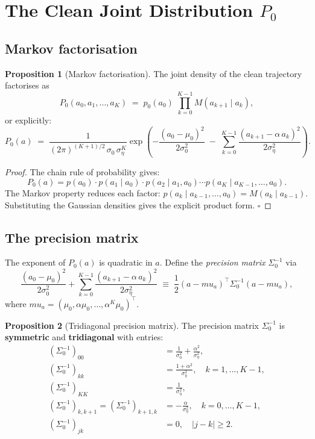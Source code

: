 \documentclass[12pt, a4paper]{article}
\def\ba{a}%
\def\bmu{mu}%
\def\bm#1{#1}%
\theoremstyle{definition}
\newtheorem{proposition}{Proposition}[section]
\newcommand{\ba}{\bm{a}}
\newcommand{\bmu}{\bm{\mu}}
\begin{document}
\section{The Clean Joint Distribution \texorpdfstring{$P_0$}{P0}}

\subsection{Markov factorisation}

\begin{proposition}[Markov factorisation]\label{prop:markov}
The joint density of the clean trajectory factorises as
\[
  P_0(a_0, a_1, \ldots, a_K)
  \;=\;
  p_0(a_0)\;\prod_{k=0}^{K-1} M(a_{k+1} \mid a_k),
\]
or explicitly:
\[
  P_0(\ba)
  \;=\;
  \frac{1}{(2\pi)^{(K+1)/2}\,\sigma_0\,\sigma_\eta^K}
  \exp\!\left(
    -\frac{(a_0-\mu_0)^2}{2\sigma_0^2}
    \;-\;
    \sum_{k=0}^{K-1}\frac{(a_{k+1}-\alpha\,a_k)^2}{2\sigma_\eta^2}
  \right).
\]
\end{proposition}

\begin{proof}
The chain rule of probability gives:
\[
  P_0(\ba) = p(a_0)\cdot p(a_1\mid a_0)\cdot p(a_2\mid a_1,a_0)
  \cdots p(a_K\mid a_{K-1},\ldots,a_0).
\]
The Markov property reduces each factor: $p(a_k\mid a_{k-1},\ldots,a_0)
= M(a_k\mid a_{k-1})$. Substituting the Gaussian densities gives the
explicit product form. \qquad$\square$
\end{proof}

\subsection{The precision matrix}

The exponent of $P_0(\ba)$ is quadratic in $\ba$. Define the
\emph{precision matrix} $\Sigma_0^{-1}$ via
\[
  \frac{(a_0-\mu_0)^2}{2\sigma_0^2}
  + \sum_{k=0}^{K-1}\frac{(a_{k+1}-\alpha\,a_k)^2}{2\sigma_\eta^2}
  \;\equiv\;
  \frac{1}{2}(\ba-\bmu_a)^\top \Sigma_0^{-1}(\ba-\bmu_a),
\]
where $\bmu_a = (\mu_0, \alpha\mu_0, \ldots, \alpha^K\mu_0)^\top$.

\begin{proposition}[Tridiagonal precision matrix]\label{prop:tridiag}
The precision matrix $\Sigma_0^{-1}$ is \textbf{symmetric} and
\textbf{tridiagonal} with entries:
\begin{align*}
  (\Sigma_0^{-1})_{00}
    &= \frac{1}{\sigma_0^2} + \frac{\alpha^2}{\sigma_\eta^2}, \\
  (\Sigma_0^{-1})_{kk}
    &= \frac{1+\alpha^2}{\sigma_\eta^2},
    \quad k = 1, \ldots, K-1, \\
  (\Sigma_0^{-1})_{KK}
    &= \frac{1}{\sigma_\eta^2}, \\
  (\Sigma_0^{-1})_{k,k+1}
  = (\Sigma_0^{-1})_{k+1,k}
    &= -\frac{\alpha}{\sigma_\eta^2},
    \quad k = 0, \ldots, K-1, \\
  (\Sigma_0^{-1})_{jk}
    &= 0,
    \quad |j-k| \geq 2.
\end{align*}
\end{proposition}
\end{document}
